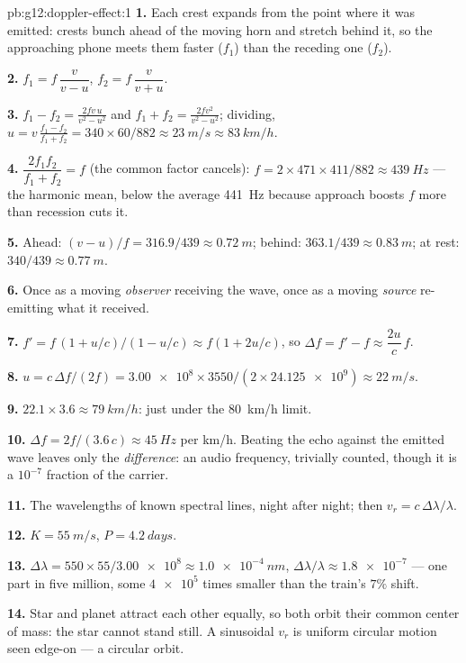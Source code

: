 \begin{solution}{pb:g12:doppler-effect:1}
\textbf{1.} Each crest expands from the point where it was emitted: crests bunch ahead
of the moving horn and stretch behind it, so the approaching phone meets them faster
($f_1$) than the receding one ($f_2$).

\textbf{2.} $f_1 = f\,\dfrac{v}{v - u}$, \quad $f_2 = f\,\dfrac{v}{v + u}$.

\textbf{3.} $f_1 - f_2 = \frac{2fv\,u}{v^2 - u^2}$ and $f_1 + f_2 =
\frac{2fv^2}{v^2 - u^2}$; dividing, $u = v\,\frac{f_1 - f_2}{f_1 + f_2} =
340 \times 60/882 \approx \qty{23}{m/s} \approx \qty{83}{km/h}$.

\textbf{4.} $\dfrac{2f_1 f_2}{f_1 + f_2} = f$ (the common factor cancels):
$f = 2 \times 471 \times 411/882 \approx \qty{439}{Hz}$ --- the harmonic mean, below
the average \qty{441}{Hz} because approach boosts $f$ more than recession cuts it.

\textbf{5.} Ahead: $(v - u)/f = 316.9/439 \approx \qty{0.72}{m}$; behind:
$363.1/439 \approx \qty{0.83}{m}$; at rest: $340/439 \approx \qty{0.77}{m}$.

\textbf{6.} Once as a moving \emph{observer} receiving the wave, once as a moving
\emph{source} re-emitting what it received.

\textbf{7.} $f' = f\,(1 + u/c)/(1 - u/c) \approx f(1 + 2u/c)$, so
$\Delta f = f' - f \approx \dfrac{2u}{c}\,f$.

\textbf{8.} $u = c\,\Delta f/(2f) = \num{3.00e8} \times 3550/(2 \times \num{24.125e9})
\approx \qty{22}{m/s}$.

\textbf{9.} $22.1 \times 3.6 \approx \qty{79}{km/h}$: just under the \qty{80}{km/h}
limit.

\textbf{10.} $\Delta f = 2f/(3.6\,c) \approx \qty{45}{Hz}$ per \unit{km/h}. Beating the
echo against the emitted wave leaves only the \emph{difference}: an audio frequency,
trivially counted, though it is a $10^{-7}$ fraction of the carrier.

\textbf{11.} The wavelengths of known spectral lines, night after night; then
$v_r = c\,\Delta\lambda/\lambda$.

\textbf{12.} $K = \qty{55}{m/s}$, $P = \qty{4.2}{days}$.

\textbf{13.} $\Delta\lambda = 550 \times 55/\num{3.00e8} \approx \qty{1.0e-4}{nm}$,
$\Delta\lambda/\lambda \approx \num{1.8e-7}$ --- one part in five million, some
$\num{4e5}$ times smaller than the train's $7\%$ shift.

\textbf{14.} Star and planet attract each other equally, so both orbit their common
center of mass: the star cannot stand still. A sinusoidal $v_r$ is uniform circular
motion seen edge-on --- a circular orbit.


\end{solution}

